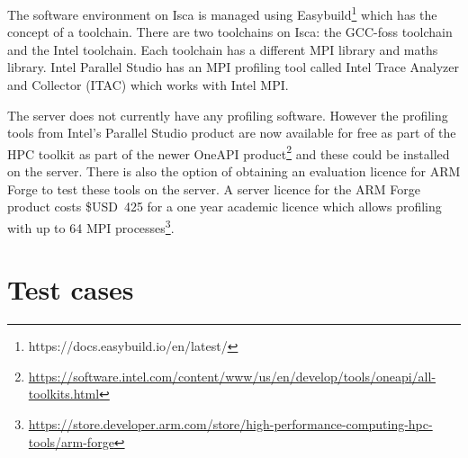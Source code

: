 \documentclass[a4paper,titlepage]{article}
\begin{document}
The software environment on Isca is managed using Easybuild\footnote{https://docs.easybuild.io/en/latest/} which has the concept of a toolchain. There are two toolchains on Isca: the GCC-foss toolchain and the Intel toolchain. Each toolchain has a different MPI library and maths library. Intel Parallel Studio has an MPI profiling tool called Intel Trace Analyzer and Collector (ITAC) which works with Intel MPI.

The server does not currently have any profiling software. However the profiling tools from Intel's Parallel Studio product are now available for free as part of the HPC toolkit as part of the newer OneAPI product\footnote{\url{https://software.intel.com/content/www/us/en/develop/tools/oneapi/all-toolkits.html}} and these could be installed on the server. There is also the option of obtaining an evaluation licence for ARM Forge to test these tools on the server. A server licence for the ARM Forge product costs \$USD~425 for a one year academic licence which allows profiling with up to 64 MPI processes\footnote{\url{https://store.developer.arm.com/store/high-performance-computing-hpc-tools/arm-forge}}.


\section{Test cases}
\label{section:test_cases}
\end{document}
